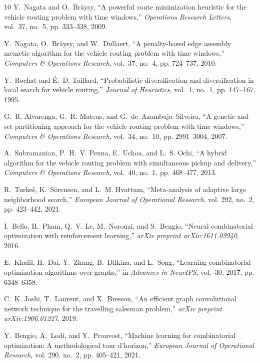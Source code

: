 \documentclass{ieeeaccess}
\begin{document}
{\begin{thebibliography}{10}
Y.~Nagata and O.~Br{\"a}ysy, ``A powerful route minimization heuristic for the vehicle routing problem with time windows,'' \emph{Operations Research Letters}, vol.~37, no.~5, pp. 333--338, 2009.

Y.~Nagata, O.~Br{\"a}ysy, and W.~Dullaert, ``A penalty-based edge assembly memetic algorithm for the vehicle routing problem with time windows,'' \emph{Computers \& Operations Research}, vol.~37, no.~4, pp. 724--737, 2010.

Y.~Rochat and {\'E}.~D. Taillard, ``Probabilistic diversification and diversification in local search for vehicle routing,'' \emph{Journal of Heuristics}, vol.~1, no.~1, pp. 147--167, 1995.

G.~R. Alvarenga, G.~R. Mateus, and G.~de~Azambuja~Silveira, ``A genetic and set partitioning approach for the vehicle routing problem with time windows,'' \emph{Computers \& Operations Research}, vol.~34, no.~10, pp. 2991--3004, 2007.

A.~Subramanian, P.~H.~V. Penna, E.~Uchoa, and L.~S. Ochi, ``A hybrid algorithm for the vehicle routing problem with simultaneous pickup and delivery,'' \emph{Computers \& Operations Research}, vol.~40, no.~1, pp. 468--477, 2013.

R.~Turke{\v{s}}, K.~S{\"o}rensen, and L.~M. Hvattum, ``Meta-analysis of adaptive large neighborhood search,'' \emph{European Journal of Operational Research}, vol. 292, no.~2, pp. 423--442, 2021.

I.~Bello, H.~Pham, Q.~V. Le, M.~Norouzi, and S.~Bengio, ``Neural combinatorial optimization with reinforcement learning,'' \emph{arXiv preprint arXiv:1611.09940}, 2016.

E.~Khalil, H.~Dai, Y.~Zhang, B.~Dilkina, and L.~Song, ``Learning combinatorial optimization algorithms over graphs,'' in \emph{Advances in NeurIPS}, vol.~30, 2017, pp. 6348--6358.

C.~K. Joshi, T.~Laurent, and X.~Bresson, ``An efficient graph convolutional network technique for the travelling salesman problem,'' \emph{arXiv preprint arXiv:1906.01227}, 2019.

Y.~Bengio, A.~Lodi, and Y.~Prouvost, ``Machine learning for combinatorial optimization: A methodological tour d'horizon,'' \emph{European Journal of Operational Research}, vol. 290, no.~2, pp. 405--421, 2021.


\end{thebibliography}}
\end{document}
